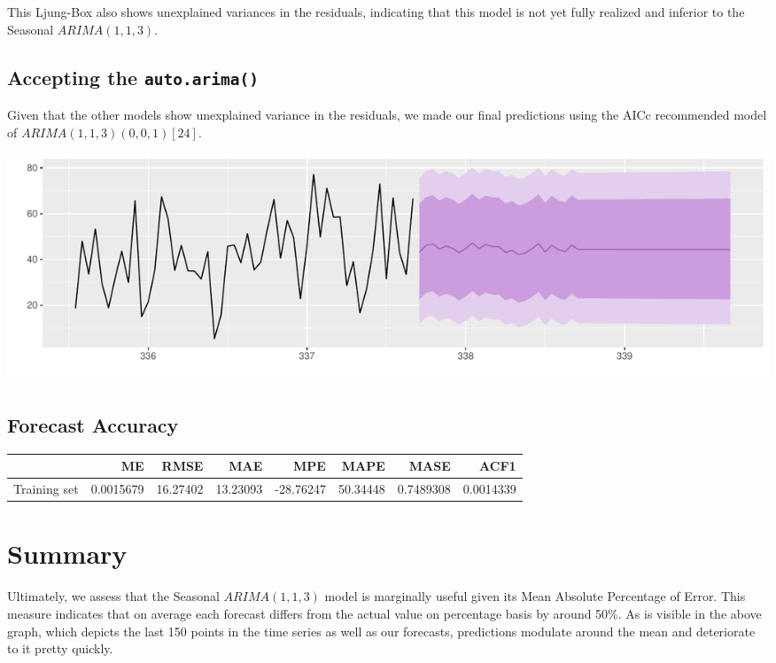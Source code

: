 \documentclass[openany]{book}
\begin{document}
This Ljung-Box also shows unexplained variances in the residuals,
indicating that this model is not yet fully realized and inferior to the
Seasonal \(ARIMA (1,1,3)\).

\hypertarget{accepting-the-auto.arima}{%
\subsection{\texorpdfstring{Accepting the
\texttt{auto.arima()}}{Accepting the auto.arima()}}\label{accepting-the-auto.arima}}

Given that the other models show unexplained variance in the residuals,
we made our final predictions using the AICc recommended model of
\(ARIMA (1,1,3)(0,0,1)[24]\).

\includegraphics{Group2_Project1_Fall2019_files/figure-latex/unnamed-chunk-26-1.pdf}

\hypertarget{forecast-accuracy}{%
\subsection{Forecast Accuracy}\label{forecast-accuracy}}

\begin{tabular}{l|r|r|r|r|r|r|r}
\hline
  & ME & RMSE & MAE & MPE & MAPE & MASE & ACF1\\
\hline
Training set & 0.0015679 & 16.27402 & 13.23093 & -28.76247 & 50.34448 & 0.7489308 & 0.0014339\\
\hline
\end{tabular}

\hypertarget{summary-2}{%
\section{Summary}\label{summary-2}}

Ultimately, we assess that the Seasonal \(ARIMA (1,1,3)\) model is
marginally useful given its Mean Absolute Percentage of Error. This
measure indicates that on average each forecast differs from the actual
value on percentage basis by around 50\%. As is visible in the above
graph, which depicts the last 150 points in the time series as well as
our forecasts, predictions modulate around the mean and deteriorate to
it pretty quickly.
\end{document}
